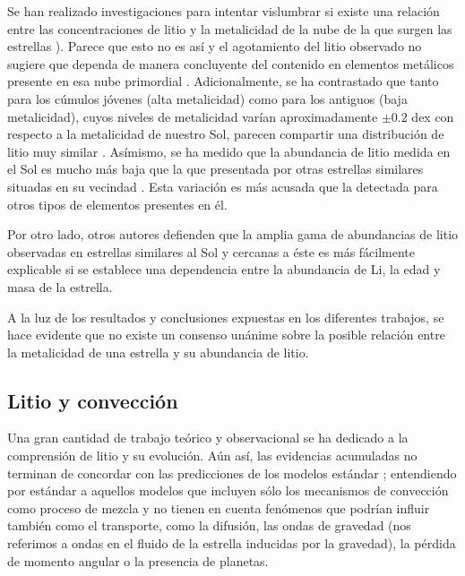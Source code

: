 Se han realizado investigaciones para intentar vislumbrar si existe una relación entre las concentraciones de litio y la metalicidad de la nube de la que surgen las estrellas \citep{Pinsonneault1997, BarradoyNavascues2001}). Parece que esto no es así y el agotamiento del litio observado no sugiere que dependa de manera concluyente del contenido en elementos metálicos presente en esa nube primordial \citep{Guiglion2016}. Adicionalmente, se ha contrastado que tanto para los cúmulos jóvenes (alta metalicidad) como para los antiguos (baja metalicidad), cuyos niveles de metalicidad varían aproximadamente $\pm$0.2 dex con respecto a la metalicidad de nuestro Sol, parecen compartir una distribución de litio muy similar \citep{Sestito2005}. Asímismo, se ha medido que la abundancia de litio medida en el Sol es mucho más baja que la que presentada por otras estrellas similares situadas en su vecindad \citep{Reddy2003}. Esta variación es más acusada que la detectada para otros tipos de elementos presentes en él.\par

Por otro lado, otros autores \citep{Sestito2005} defienden que la amplia gama de abundancias de litio observadas en estrellas similares al Sol y cercanas a éste es más fácilmente explicable si se establece una dependencia entre la abundancia de Li, la edad y masa de la estrella.\par

A la luz de los resultados y conclusiones expuestas en los diferentes trabajos, se hace evidente que no existe un consenso unánime sobre la posible relación entre la metalicidad de una estrella y su abundancia de litio.\par

\subsection{Litio y convección}
Una gran cantidad de trabajo teórico y observacional se ha dedicado a la comprensión de litio y su evolución. Aún así, las evidencias acumuladas no terminan de concordar con las predicciones de los modelos estándar \citep{Sestito2005}; entendiendo por estándar a aquellos modelos que incluyen sólo los mecanismos de convección como proceso de mezcla y no tienen en cuenta fenómenos que podrían influir también como el transporte, como la difusión, las ondas de gravedad (nos referimos a ondas en el fluido de la estrella inducidas por la gravedad), la pérdida de momento angular o la presencia de planetas.\par

